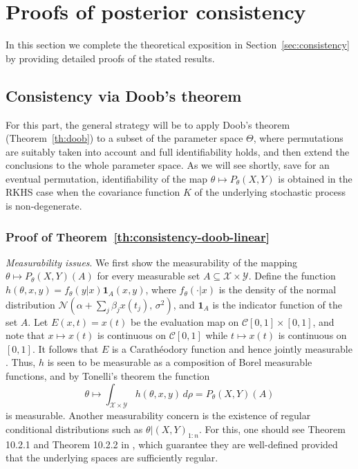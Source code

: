 \newpage
\section{Proofs of posterior consistency}\label{app:proofs}

In this section we complete the theoretical exposition in Section~\ref{sec:consistency} by providing detailed proofs of the stated results.

\subsection{Consistency via Doob's theorem}

For this part, the general strategy will be to apply Doob's theorem (Theorem~\ref{th:doob}) to a subset of the parameter space \(\Theta\), where permutations are suitably taken into account and full identifiability holds, and then extend the conclusions to the whole parameter space. As we will see shortly, save for an eventual permutation, identifiability of the map \(\theta \mapsto P_\theta(X,Y)\) is obtained in the RKHS case when the covariance function \(K\) of the underlying stochastic process is non-degenerate.

\subsubsection*{Proof of Theorem~\ref{th:consistency-doob-linear}}

\textit{Measurability issues}. We first show the measurability of the mapping \(\theta \mapsto P_\theta(X,Y)(A)\) for every measurable set \(A \subseteq \mathcal X \times \mathcal Y\). Define the function \(h(\theta, x, y)=f_\theta(y|x)\bm{1}_A(x,y)\), where \(f_\theta(\cdot|x)\) is the density of the normal distribution \( \mathcal N(\alpha + \sum_j \beta_j x(t_j),\, \sigma^2)\), and \(\bm{1}_{A}\) is the indicator function of the set \(A\). Let \(E(x,t)=x(t)\) be the evaluation map on \(\mathcal C[0,1]\times [0,1]\), and note that \(x\mapsto x(t)\) is continuous on \(\mathcal C[0,1]\) while \(t\mapsto x(t)\) is continuous on \([0,1]\). It follows that \(E\) is a Carathéodory function and hence jointly measurable \citep[][Lemma~4.51]{aliprantis2006infinite}. Thus, \(h\) is seen to be measurable as a composition of Borel measurable functions, and by Tonelli's theorem \citep[e.g.][Theorem~2.37]{folland1999real} the function
\[
  \theta \mapsto \int_{\mathcal X \times \mathcal Y} h(\theta, x, y)\, d\rho = P_\theta(X, Y)(A)
\]
is measurable. Another measurability concern is the existence of regular conditional distributions such as \(\theta|(X, Y)_{1:n}\). For this, one should see Theorem 10.2.1 and Theorem 10.2.2 in \citet{dudley2002real}, which guarantee they are well-defined provided that the underlying spaces are sufficiently regular.

